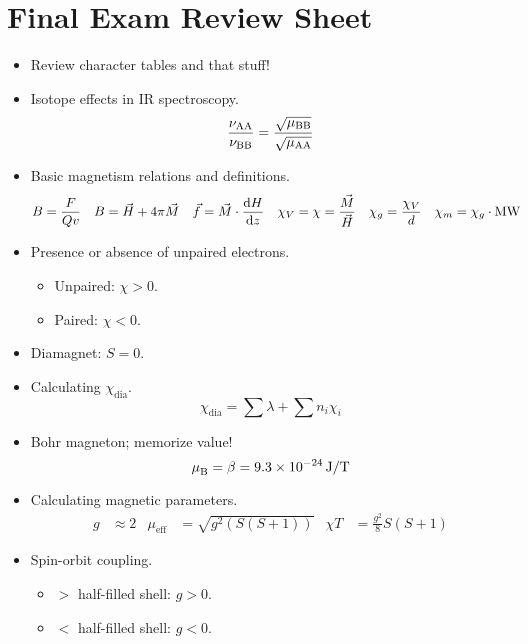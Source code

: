 \documentclass[../notes.tex]{subfiles}
\begin{document}
\section{Final Exam Review Sheet}
\begin{itemize}
    \item {}Review character tables and that stuff!
    \item Isotope effects in IR spectroscopy.
    \begin{equation*}
        \frac{\nu_{\ce{AA}}}{\nu_{\ce{BB}}} = \frac{\sqrt{\mu_{\ce{BB}}}}{\sqrt{\mu_{\ce{AA}}}}
    \end{equation*}
    \item Basic magnetism relations and definitions.
    \begin{align*}
        B &= \frac{F}{Qv}&
        B &= \vec{H}+4\pi\vec{M}&
        \vec{f} &= \vec{M}\cdot\dv{H}{z}&
        \chi_V = \chi &= \frac{\vec{M}}{\vec{H}}&
        \chi_g &= \frac{\chi_V}{d}&
        \chi_m &= \chi_g\cdot\text{MW}
    \end{align*}
    \item Presence or absence of unpaired electrons.
    \begin{itemize}
        \item Unpaired: $\chi>0$.
        \item Paired: $\chi<0$.
    \end{itemize}
    \item Diamagnet: $S=0$.
    \item Calculating $\chi_\text{dia}$.
    \begin{equation*}
        \chi_\text{dia} = \sum\lambda+\sum n_i\chi_i
    \end{equation*}
    \item Bohr magneton; memorize value!
    \begin{equation*}
        \mB = \beta = \SI[per-mode=symbol]{9.3e-24}{\joule\per\tesla}
    \end{equation*}
    \item Calculating magnetic parameters.
    \begin{align*}
        g &\approx 2&
        \mu_\text{eff} &= \sqrt{g^2(S(S+1))}&
        \chi T &= \frac{g^2}{8}S(S+1)
    \end{align*}
    \item Spin-orbit coupling.
    \begin{itemize}
        \item $>$ half-filled shell: $g>0$.
        \item $<$ half-filled shell: $g<0$.

\end{itemize}
\end{itemize}
\end{document}
